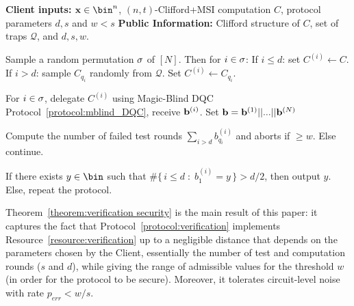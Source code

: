 \begin{protocoll}
\caption{Verified Delegated Quantum Computation}
\label{protocol:verification}
\begin{algorithmic}[0]
    \State \textbf{Client inputs:} $\x\in\bin^n$, $(n,t)$-Clifford+MSI computation $C$, protocol parameters $d, s$ and $w<s$
    \State \textbf{Public Information:} Clifford structure of $C$, set of traps $\mathcal Q$, and $d, s, w$.

    \State Sample a random permutation $\sigma$ of $[N]$. Then for $i\in \sigma$:
    \State If $i\leq d$: set $C^{(i)} \leftarrow C$. 
    \State If $i> d$: sample $C_{q_i}$ randomly from $\mathcal Q$. Set $C^{(i)} \gets C_{q_i}$. 
  \EndProcedure


  \State For $i\in \sigma$, delegate $C^{(i)}$ using Magic-Blind DQC Protocol~\ref{protocol:mblind_DQC}, receive $\mathbf b^{(i)}$.
    \State Set $\mathbf b = \mathbf b^{(1)} || ... || \mathbf b^{(N)}$
  \EndProcedure

    \State Compute the number of failed test rounds $\sum_{i>d}b^{(i)}_{q_i}$ and aborts if $\geq w$. Else continue.
  \EndProcedure

  \State If there exists $y\in \bin$ such that $\#\{\, i \leq d \;:\; b^{(i)}_1 = y \,\} > d/2$, then output $y$.
  \State Else, repeat the protocol.
\EndProcedure

\end{algorithmic}
\end{protocoll}

Theorem~\ref{theorem:verification security} is the main result of this paper: it captures the fact that Protocol~\ref{protocol:verification} implements Resource~\ref{resource:verification} up to a negligible distance that depends on the parameters chosen by the Client, essentially the number of test and computation rounds ($s$ and $d$), while giving the range of admissible values for the threshold $w$ (in order for the protocol to be secure). Moreover, it tolerates circuit-level noise with rate $p_{err} < w/s$.


